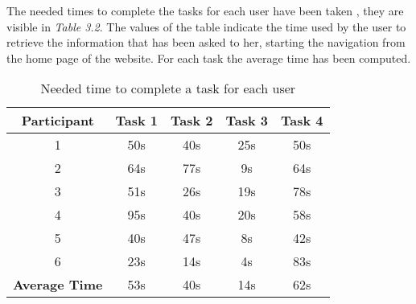 \documentclass[../../UsabilityReport.tex]{subfiles}
\begin{document}
 	The needed times to complete the tasks for each user have been taken , they are visible in \textit{Table 3.2}. The values of the table indicate the time used by the user to retrieve the information that has been asked to her, starting the navigation from the home page of the website. For each task the average time has been computed.
	\begin{table}[htb]
		\caption{Needed time to complete a task for each user}
		\centering
		\begin{tabular}{ccccc}
			\hline
			\multicolumn{1}{|c|}{\textbf{Participant}} & \multicolumn{1}{l|}{\textbf{Task 1}} & \multicolumn{1}{l|}{\textbf{Task 2}} & \multicolumn{1}{l|}{\textbf{Task 3}} & \multicolumn{1}{l|}{\textbf{Task 4}} \\ \hline
			\multicolumn{1}{|c|}{1} & \multicolumn{1}{|c|}{50s} & \multicolumn{1}{c|}{40s} & \multicolumn{1}{c|}{25s} & \multicolumn{1}{c|}{50s}\\ \hline
			\multicolumn{1}{|c|}{2} & \multicolumn{1}{|c|}{64s} & \multicolumn{1}{c|}{77s} & \multicolumn{1}{c|}{9s} & \multicolumn{1}{c|}{64s}\\ \hline
			\multicolumn{1}{|c|}{3} & \multicolumn{1}{|c|}{51s} & \multicolumn{1}{c|}{26s} & \multicolumn{1}{c|}{19s} & \multicolumn{1}{c|}{78s}\\ \hline
			\multicolumn{1}{|c|}{4} & \multicolumn{1}{|c|}{95s} & \multicolumn{1}{c|}{40s} & \multicolumn{1}{c|}{20s} & \multicolumn{1}{c|}{58s}\\ \hline
			\multicolumn{1}{|c|}{5} & \multicolumn{1}{|c|}{40s} & \multicolumn{1}{c|}{47s} & \multicolumn{1}{c|}{8s} & \multicolumn{1}{c|}{42s}\\ \hline
			\multicolumn{1}{|c|}{6} & \multicolumn{1}{|c|}{23s} & \multicolumn{1}{c|}{14s} & \multicolumn{1}{c|}{4s} & \multicolumn{1}{c|}{83s}\\ \hline
			\multicolumn{1}{|p{27.5mm}|}{\textbf{Average Time}} & \multicolumn{1}{c|}{53s} & \multicolumn{1}{c|}{40s} & \multicolumn{1}{c|}{14s} & \multicolumn{1}{c|}{62s}\\ \hline
		\end{tabular}
	\end{table}
\end{document}
